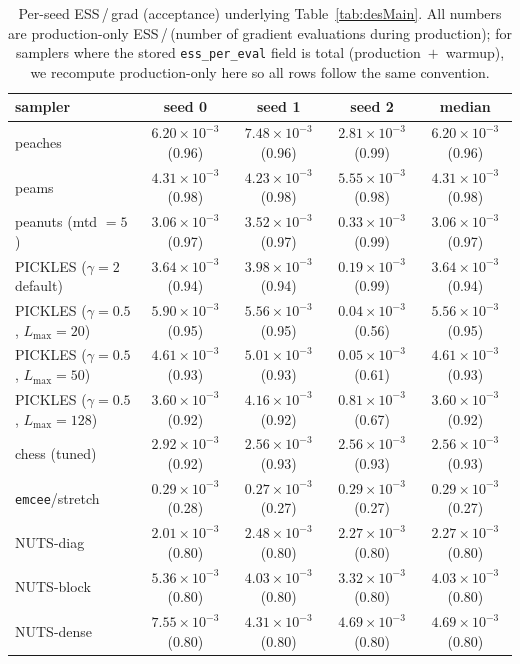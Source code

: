 \documentclass{article}
\begin{document}
\begin{table}[h]
\centering
\caption{Per-seed ESS\,/\,grad (acceptance) underlying
Table~\ref{tab:desMain}.  All numbers are production-only
ESS\,/\,(number of gradient evaluations during production); for samplers
where the stored \texttt{ess\_per\_eval} field is total
(production~$+$~warmup), we recompute production-only here so all rows
follow the same convention.}
\label{tab:desPerSeedMain}
\small
\setlength{\tabcolsep}{4pt}
\begin{tabular}{l c c c c}
\toprule
sampler & seed 0 & seed 1 & seed 2 & median \\
\midrule
peaches & $6.20\!\times\!10^{-3}$ (0.96) & $7.48\!\times\!10^{-3}$ (0.96) & $2.81\!\times\!10^{-3}$ (0.99) & $6.20\!\times\!10^{-3}$ (0.96) \\
peams   & $4.31\!\times\!10^{-3}$ (0.98) & $4.23\!\times\!10^{-3}$ (0.98) & $5.55\!\times\!10^{-3}$ (0.98) & $4.31\!\times\!10^{-3}$ (0.98) \\
peanuts (mtd $=5$) & $3.06\!\times\!10^{-3}$ (0.97) & $3.52\!\times\!10^{-3}$ (0.97) & $0.33\!\times\!10^{-3}$ (0.99) & $3.06\!\times\!10^{-3}$ (0.97) \\
PICKLES ($\gamma{=}2$ default)             & $3.64\!\times\!10^{-3}$ (0.94) & $3.98\!\times\!10^{-3}$ (0.94) & $0.19\!\times\!10^{-3}$ (0.99) & $3.64\!\times\!10^{-3}$ (0.94) \\
PICKLES ($\gamma{=}0.5$, $L_{\max}{=}20$)  & $5.90\!\times\!10^{-3}$ (0.95) & $5.56\!\times\!10^{-3}$ (0.95) & $0.04\!\times\!10^{-3}$ (0.56) & $5.56\!\times\!10^{-3}$ (0.95) \\
PICKLES ($\gamma{=}0.5$, $L_{\max}{=}50$)  & $4.61\!\times\!10^{-3}$ (0.93) & $5.01\!\times\!10^{-3}$ (0.93) & $0.05\!\times\!10^{-3}$ (0.61) & $4.61\!\times\!10^{-3}$ (0.93) \\
PICKLES ($\gamma{=}0.5$, $L_{\max}{=}128$) & $3.60\!\times\!10^{-3}$ (0.92) & $4.16\!\times\!10^{-3}$ (0.92) & $0.81\!\times\!10^{-3}$ (0.67) & $3.60\!\times\!10^{-3}$ (0.92) \\
chess (tuned) & $2.92\!\times\!10^{-3}$ (0.92) & $2.56\!\times\!10^{-3}$ (0.93) & $2.56\!\times\!10^{-3}$ (0.93) & $2.56\!\times\!10^{-3}$ (0.93) \\
\texttt{emcee}/stretch        & $0.29\!\times\!10^{-3}$ (0.28) & $0.27\!\times\!10^{-3}$ (0.27) & $0.29\!\times\!10^{-3}$ (0.27) & $0.29\!\times\!10^{-3}$ (0.27) \\
\midrule
NUTS-diag  & $2.01\!\times\!10^{-3}$ (0.80) & $2.48\!\times\!10^{-3}$ (0.80) & $2.27\!\times\!10^{-3}$ (0.80) & $2.27\!\times\!10^{-3}$ (0.80) \\
NUTS-block & $5.36\!\times\!10^{-3}$ (0.80) & $4.03\!\times\!10^{-3}$ (0.80) & $3.32\!\times\!10^{-3}$ (0.80) & $4.03\!\times\!10^{-3}$ (0.80) \\
NUTS-dense & $7.55\!\times\!10^{-3}$ (0.80) & $4.31\!\times\!10^{-3}$ (0.80) & $4.69\!\times\!10^{-3}$ (0.80) & $4.69\!\times\!10^{-3}$ (0.80) \\
\bottomrule
\end{tabular}
\end{table}
\end{document}
